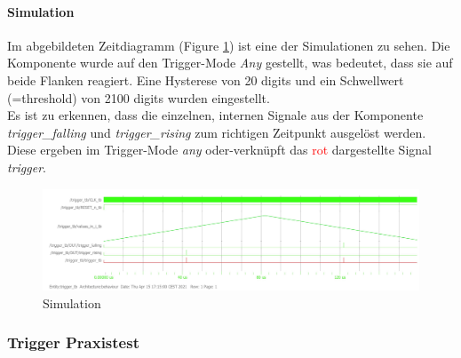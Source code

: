 \paragraph{Simulation}
Im abgebildeten Zeitdiagramm (Figure \ref{TriggerSim}) ist eine der Simulationen zu sehen. Die Komponente wurde auf den Trigger-Mode \textit{Any} gestellt, was bedeutet, dass sie auf beide Flanken reagiert. Eine Hysterese von 20 digits und ein Schwellwert (=threshold) von 2100 digits wurden eingestellt.\\Es ist zu erkennen, dass die einzelnen, internen Signale aus der Komponente \textit{trigger\_falling} und \textit{trigger\_rising} zum richtigen Zeitpunkt ausgelöst werden. Diese ergeben im Trigger-Mode \textit{any} oder-verknüpft das \textcolor{red}{rot} dargestellte Signal \textit{trigger}. 
\begin{figure}[h]
	\begin{center}
		\includegraphics[width=16cm]{SAUER/Grafiken/Trigger/Simulation.jpg}
		\caption{Simulation}
		\label{TriggerSim}
	\end{center}
\end{figure}
\subsubsection{Trigger Praxistest}
